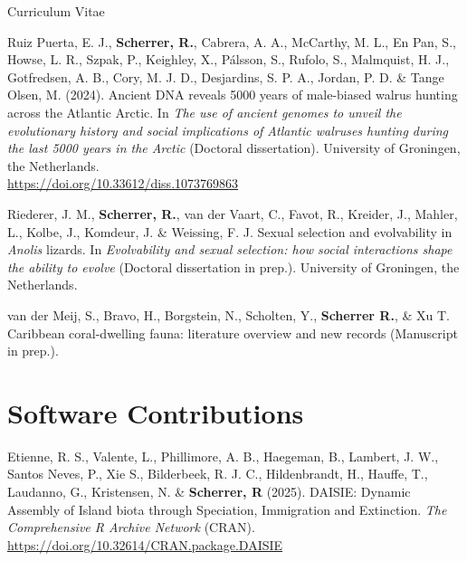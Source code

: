 \documentclass[11pt,a4paper]{article}
\begin{document}
\begin{cv}{Curriculum Vitae}
\begin{cvlist}{}
            \item[]
            Ruiz Puerta, E. J., \textbf{Scherrer, R.}, Cabrera, A. A., McCarthy, M. L., En Pan, S., Howse, L. R., Szpak, P., Keighley, X., Pálsson, S., Rufolo, S., Malmquist, H. J., Gotfredsen, A. B., Cory, M. J. D., Desjardins, S. P. A., Jordan, P. D. \& Tange Olsen, M. (2024). Ancient DNA reveals 5000 years of male-biased walrus hunting across the Atlantic Arctic. In 
            \textit{The use of ancient genomes to unveil the evolutionary history and social implications of Atlantic walruses hunting during the last 5000 years in the Arctic} (Doctoral dissertation). University of Groningen, the Netherlands.\\
            \url{https://doi.org/10.33612/diss.1073769863}

            \item[]
            Riederer, J. M., \textbf{Scherrer, R.}, van der Vaart, C., Favot, R., Kreider, J., Mahler, L., Kolbe, J., Komdeur, J. \& Weissing, F. J. Sexual selection and evolvability in \textit{Anolis} lizards. In \textit{Evolvability and sexual selection: how social interactions shape the ability to evolve} (Doctoral dissertation in prep.). University of Groningen, the Netherlands.

            \item
            van der Meij, S., Bravo, H., Borgstein, N., Scholten, Y., \textbf{Scherrer R.}, \& Xu T. Caribbean coral-dwelling fauna: literature overview and new records (Manuscript in prep.).
            
        \end{cvlist}

        \section{Software Contributions}

        \begin{cvlist}{}

            \item 
            Etienne, R. S., Valente, L., Phillimore, A. B., Haegeman, B., Lambert, J. W., Santos Neves, P., Xie S., Bilderbeek, R. J. C., Hildenbrandt, H., Hauffe, T., Laudanno, G., Kristensen, N. \& \textbf{Scherrer, R} (2025). DAISIE: Dynamic Assembly of Island biota through Speciation, Immigration and Extinction. \textit{The Comprehensive R Archive Network} (CRAN).\\
            \url{https://doi.org/10.32614/CRAN.package.DAISIE}
            

\end{cvlist}
\end{cv}
\end{document}
